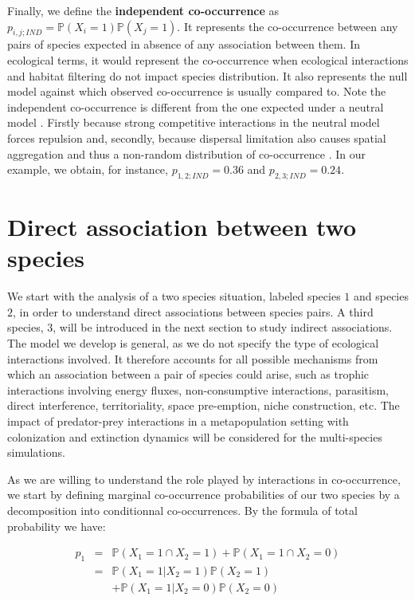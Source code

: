 Finally, we define the \textbf{independent co-occurrence} as
$p_{i,j;IND}=\mathbb{P}(X_{i}=1)\mathbb{P}(X_{j}=1)$. It represents the
co-occurrence between any pairs of species expected in absence of any
association between them. In ecological terms, it would represent the
co-occurrence when ecological interactions and habitat filtering do not impact
species distribution. It also represents the null model against which
observed co-occurrence is usually compared to. Note the independent
co-occurrence is different from the one expected under a neutral model
\citep{Hubbell2001}. Firstly because strong competitive interactions in
the neutral model forces repulsion and, secondly, because dispersal limitation
also causes spatial aggregation and thus a non-random distribution of
co-occurrence \citep{Bell2005}. In our example, we obtain, for instance, $p_{1,2;IND}=0.36$ and $p_{2,3;IND}=0.24$.

\section*{Direct association between two species}
\label{direct}

We start with the analysis of a two species situation, labeled species $1$ and
species $2$, in order to understand direct associations between species pairs. A
third species, $3$, will be introduced in the next section to study indirect
associations. The model we develop is general, as we do not specify the type of
ecological interactions involved. It therefore accounts for all possible mechanisms from
which an association between a pair of species could arise, such as trophic
interactions involving energy fluxes, non-consumptive interactions, parasitism,
direct interference, territoriality, space pre-emption, niche construction,
etc. The impact of predator-prey interactions in a metapopulation setting with
colonization and extinction dynamics will be considered for the multi-species
simulations.

As we are willing to understand the role played by interactions in co-occurrence, we start by defining marginal co-occurrence probabilities of our two species by a decomposition into conditionnal co-occurrences. By the formula of total probability we have:

  \begin{eqnarray} \label{s2ind}
    \nonumber p_1&=& \mathbb{P}(X_{1}=1\cap X_{2}=1)+ \mathbb{P}(X_{1}=1\cap X_{2}=0)\\
    \nonumber \label{sp2ind} &=& \mathbb{P}(X_{1}=1| X_{2}=1)\mathbb{P}(X_{2}=1) \\
    &&+ \mathbb{P}(X_{1}=1| X_{2}=0)\mathbb{P}(X_{2}=0)
  \end{eqnarray}


